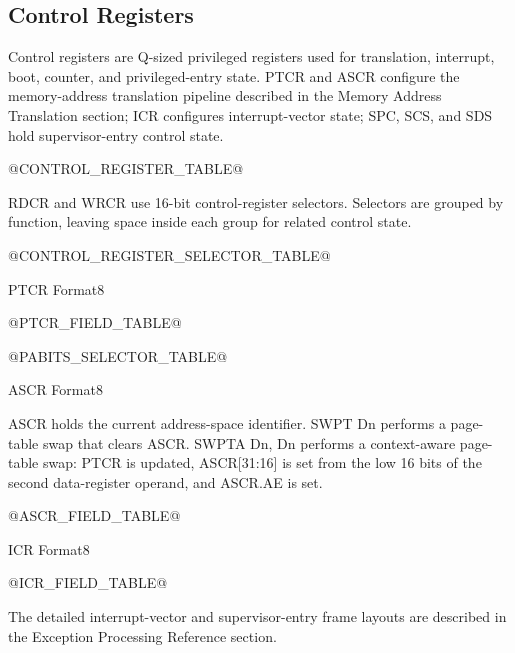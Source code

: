 \subsection{Control Registers}
Control registers are Q-sized privileged registers used for translation, interrupt, boot, counter, and
privileged-entry state. PTCR and ASCR configure the memory-address translation pipeline described in the
Memory Address Translation section; ICR configures interrupt-vector state; SPC, SCS, and SDS hold
supervisor-entry control state.

@CONTROL_REGISTER_TABLE@

RDCR and WRCR use 16-bit control-register selectors. Selectors are grouped by function, leaving space
inside each group for related control state.

@CONTROL_REGISTER_SELECTOR_TABLE@

\begin{manuallistedformatdiagram}{PTCR Format}{8}
\end{manuallistedformatdiagram}


@PTCR_FIELD_TABLE@

@PABITS_SELECTOR_TABLE@

\begin{manuallistedformatdiagram}{ASCR Format}{8}
\end{manuallistedformatdiagram}


ASCR holds the current address-space identifier. SWPT Dn performs a page-table swap that clears ASCR.
SWPTA Dn, Dn performs a context-aware page-table swap: PTCR is updated, ASCR[31:16] is set from the
low 16 bits of the second data-register operand, and ASCR.AE is set.

@ASCR_FIELD_TABLE@

\begin{manuallistedformatdiagram}{ICR Format}{8}
\end{manuallistedformatdiagram}


@ICR_FIELD_TABLE@

The detailed interrupt-vector and supervisor-entry frame layouts are described in the Exception Processing
Reference section.
